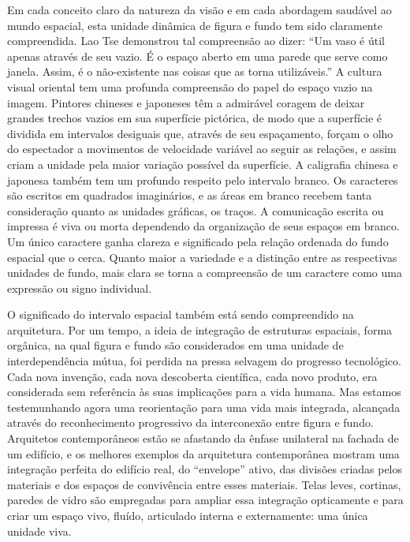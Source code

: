 \documentclass[a4paper]{article}
\begin{document}
Em cada conceito claro da natureza da visão e em cada abordagem saudável ao mundo espacial, esta unidade dinâmica de figura e fundo tem sido claramente compreendida. Lao Tse demonstrou tal compreensão ao dizer: ``Um vaso é útil apenas através de seu vazio. É o espaço aberto em uma parede que serve como janela. Assim, é o não-existente nas coisas que as torna utilizáveis.'' A cultura visual oriental tem uma profunda compreensão do papel do espaço vazio na imagem. Pintores chineses e japoneses têm a admirável coragem de deixar grandes trechos vazios em sua superfície pictórica, de modo que a superfície é dividida em intervalos desiguais que, através de seu espaçamento, forçam o olho do espectador a movimentos de velocidade variável ao seguir as relações, e assim criam a unidade pela maior variação possível da superfície. A caligrafia chinesa e japonesa também tem um profundo respeito pelo intervalo branco. Os caracteres são escritos em quadrados imaginários, e as áreas em branco recebem tanta consideração quanto as unidades gráficas, os traços. A comunicação escrita ou impressa é viva ou morta dependendo da organização de seus espaços em branco. Um único caractere ganha clareza e significado pela relação ordenada do fundo espacial que o cerca. Quanto maior a variedade e a distinção entre as respectivas unidades de fundo, mais clara se torna a compreensão de um caractere como uma expressão ou signo individual.

\par

O significado do intervalo espacial também está sendo compreendido na arquitetura. Por um tempo, a ideia de integração de estruturas espaciais, forma orgânica, na qual figura e fundo são considerados em uma unidade de interdependência mútua, foi perdida na pressa selvagem do progresso tecnológico. Cada nova invenção, cada nova descoberta científica, cada novo produto, era considerada sem referência às suas implicações para a vida humana. Mas estamos testemunhando agora uma reorientação para uma vida mais integrada, alcançada através do reconhecimento progressivo da interconexão entre figura e fundo. Arquitetos contemporâneos estão se afastando da ênfase unilateral na fachada de um edifício, e os melhores exemplos da arquitetura contemporânea mostram uma integração perfeita do edifício real, do ``envelope'' ativo, das divisões criadas pelos materiais e dos espaços de convivência entre esses materiais. Telas leves, cortinas, paredes de vidro são empregadas para ampliar essa integração opticamente e para criar um espaço vivo, fluído, articulado interna e externamente: uma única unidade viva.
\end{document}
